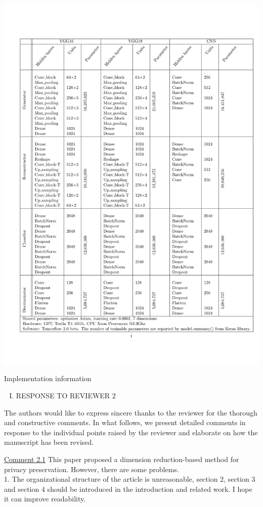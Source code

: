 \documentclass[]{elsarticle}
\begin{document}
	\setcounter{table}{0}
	\begin{table}[H]
		\centering
		\includegraphics[width=0.7\linewidth, trim=1cm 2.5cm 0.1cm 2.5cm, clip=true]{tables/implement_table}
		\caption{Implementation information}
		\label{table:implementation}
	\end{table}
	
	
	
\newpage
\begin{enumerate}[II.]
	\item RESPONSE TO REVIEWER 2
\end{enumerate}
The authors would like to express sincere thanks to the reviewer for the thorough and constructive
comments. In what follows, we present detailed comments in response to the individual points raised by
the reviewer and elaborate on how the manuscript has been revised.

\color{blue}
\underline{Comment 2.1}
This paper proposed a dimension reduction-based method for privacy preservation. However, there are some problems.\\
1. The organizational structure of the article is unreasonable, section 2, section 3 and section 4 should be introduced in the introduction and related work. I hope it can improve readability.
\end{document}
